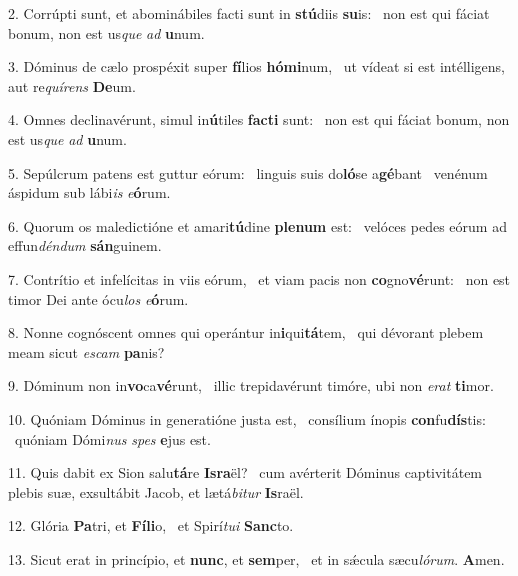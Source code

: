 2. Corrúpti sunt, et abominábiles facti sunt in \textbf{stú}diis \textbf{su}is: \ast\  non est qui fáciat bonum, non est us\textit{que} \textit{ad} \textbf{u}num.\

3. Dóminus de cælo prospéxit super \textbf{fí}lios \textbf{hó}\textbf{mi}num, \ast\  ut vídeat si est intélligens, aut re\textit{quí}\textit{rens} \textbf{De}um.\

4. Omnes declinavérunt, simul in\textbf{ú}tiles \textbf{fac}\textbf{ti} sunt: \ast\  non est qui fáciat bonum, non est us\textit{que} \textit{ad} \textbf{u}num.\

5. Sepúlcrum patens est guttur eórum: \dag\  linguis suis do\textbf{ló}se a\textbf{gé}bant \ast\  venénum áspidum sub lábi\textit{is} \textit{e}\textbf{ó}rum.\

6. Quorum os maledictióne et amari\textbf{tú}dine \textbf{ple}\textbf{num} est: \ast\  velóces pedes eórum ad effun\textit{dén}\textit{dum} \textbf{sán}guinem.\

7. Contrítio et infelícitas in viis eórum, \dag\  et viam pacis non \textbf{co}gno\textbf{vé}runt: \ast\  non est timor Dei ante ócu\textit{los} \textit{e}\textbf{ó}rum.\

8. Nonne cognóscent omnes qui operántur in\textbf{i}qui\textbf{tá}tem, \ast\  qui dévorant plebem meam sicut \textit{es}\textit{cam} \textbf{pa}nis?\

9. Dóminum non in\textbf{vo}ca\textbf{vé}runt, \ast\  illic trepidavérunt timóre, ubi non \textit{e}\textit{rat} \textbf{ti}mor.\

10. Quóniam Dóminus in generatióne justa est, \dag\  consílium ínopis \textbf{con}fu\textbf{dís}tis: \ast\  quóniam Dómi\textit{nus} \textit{spes} \textbf{e}jus est.\

11. Quis dabit ex Sion salu\textbf{tá}re \textbf{Is}\textbf{ra}ël? \ast\  cum avérterit Dóminus captivitátem plebis suæ, exsultábit Jacob, et lætá\textit{bi}\textit{tur} \textbf{Is}raël.\

12. Glória \textbf{Pa}tri, et \textbf{Fí}\textbf{li}o, \ast\  et Spirí\textit{tu}\textit{i} \textbf{Sanc}to.\

13. Sicut erat in princípio, et \textbf{nunc}, et \textbf{sem}per, \ast\  et in sǽcula sæcu\textit{ló}\textit{rum}. \textbf{A}men.\

